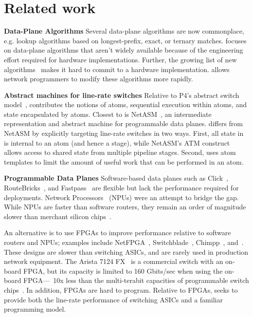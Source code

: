 \section{Related work}
\label{s:related}
\textbf{Data-Plane Algorithms}
Several data-plane algorithms are now commonplace, e.g. lookup algorithms based
on longest-prefix, exact, or ternary matches.  \pktlanguage focuses on
data-plane algorithms that aren't widely available because of the engineering
effort required for hardware implementations.  Further, the growing list of new
algorithms~\cite{pdq, d3, detail, codel, conga} makes it hard to commit to a
hardware implementation. \pktlanguage allows network programmers to modify
these algorithms more rapidly.

\textbf{Abstract machines for line-rate switches}
Relative to P4's abstract switch model~\cite{p4}, \absmachine contributes the
notions of atoms, sequential execution within atoms, and state encapsulated by
atoms. Closest to \absmachine is NetASM~\cite{netasm}, an intermediate
representation and abstract machine for programmable data planes.  \absmachine
differs from NetASM by explicitly targeting line-rate switches in two ways.
First, all state in \absmachine is internal to an atom (and hence a stage),
while NetASM's ATM construct allows access to shared state from multiple
pipeline stages. Second, \absmachine uses atom templates to limit the amount of
useful work that can be performed in an atom.

\textbf{Programmable Data Planes}
Software-based data planes such as Click~\cite{click},
RouteBricks~\cite{routebricks}, and Fastpass~\cite{fastpass} are flexible but
lack the performance required for deployments. Network
Processors~\cite{ixp2800, ixp4xx} (NPUs) were an attempt to bridge the gap.
While NPUs are faster than software routers, they remain an order of magnitude
slower than merchant silicon chips~\cite{rmt}.

An alternative is to use FPGAs to improve performance relative to software
routers and NPUs; examples include NetFPGA~\cite{netfpga},
Switchblade~\cite{switchblade}, Chimpp~\cite{chimpp}, and~\cite{silver_bullet}.
These designs are slower than switching ASICs, and are rarely used in
production network equipment. The Arista 7124 FX~\cite{7124fx} is a commercial
switch with an on-board FPGA, but its capacity is limited to 160 Gbits/sec when
using the on-board FPGA---~10x less than the multi-terabit capacities of
programmable switch chips~\cite{xpliant}. In addition, FPGAs are hard to
program. Relative to FPGAs, \pktlanguage seeks to provide both the line-rate
performance of switching ASICs and a familiar programming model.

